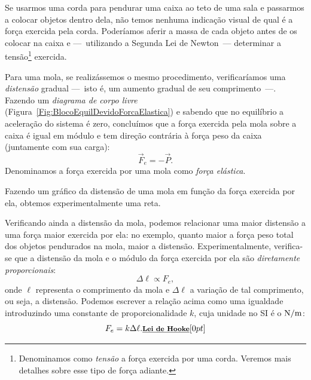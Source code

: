 Se usarmos uma corda para pendurar uma caixa ao teto de uma sala e passarmos a colocar objetos dentro dela, não temos nenhuma indicação visual de qual é a força exercida pela corda. Poderíamos aferir a massa de cada objeto antes de os colocar na caixa e ---~utilizando a Segunda Lei de Newton~--- determinar a tensão\footnote{Denominamos como \emph{tensão} a força exercida por uma corda. Veremos mais detalhes sobre esse tipo de força adiante.} exercida.

Para uma mola, se realizássemos o mesmo procedimento, verificaríamos uma \emph{distensão} gradual ---~isto é, um aumento gradual de seu comprimento~---. Fazendo um \emph{diagrama de corpo livre} (Figura~\ref{Fig:BlocoEquilDevidoForcaElastica}) e sabendo que no equilíbrio a aceleração do sistema é zero, concluímos que a força exercida pela mola sobre a caixa é igual em módulo e tem direção contrária à força peso da caixa (juntamente com sua carga):
\begin{equation}
	\vec{F}_e = -\vec{P}.
\end{equation}
%
Denominamos a força exercida por uma mola como \emph{força elástica}.

\begin{marginfigure}[15mm]
\centering
{}
\caption{Fazendo um gráfico da distensão de uma mola em função da força exercida por ela, obtemos experimentalmente uma reta.}
\end{marginfigure}

Verificando ainda a distensão da mola, podemos relacionar uma maior distensão a uma força maior exercida por ela: no exemplo, quanto maior a força peso total dos objetos pendurados na mola, maior a distensão. Experimentalmente, verifica-se que a distensão da mola e o módulo da força exercida por ela são \emph{diretamente proporcionais}:
\begin{equation}
	\Delta \ell \propto F_e,
\end{equation}
%
onde $\ell$ representa o comprimento da mola e $\Delta \ell$ a variação de tal comprimento, ou seja, a distensão. Podemos escrever a relação acima como uma igualdade introduzindo uma constante de proporcionalidade $k$, cuja unidade no SI é o $\rm{N/m}$:
\begin{equation}\label{Eq:LeiDeHooke}
	F_e = k \Delta \ell. \relax{\footnotesize\emph{\textbf{Lei de Hooke}}}[0pt]
\end{equation}

